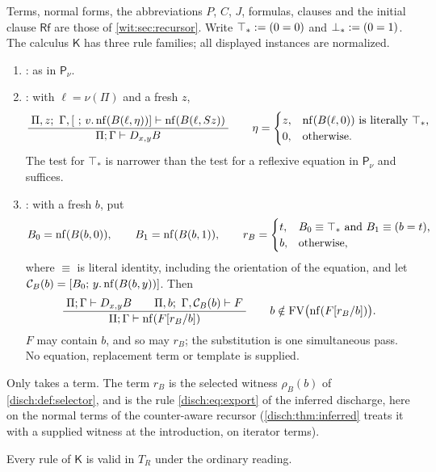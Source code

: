 Terms, normal forms, the abbreviations $P$, $C$, $J$, formulas, clauses and
the initial clause $\mathsf{Rf}$ are those of \cref{wit:sec:recursor}.
Write $\top_{*}\mathrel{:=}(0=0)$ and $\bot_{*}\mathrel{:=}(0=1)$.  The calculus
$\mathsf{K}$ has three rule families; all displayed instances are
normalized.
\begin{enumerate}[label=\textup{(\roman*)}]
\item {}: as in $\mathsf{P}_{\nu}$.
\item {}: with $\ell=\nu(\Pi)$ and a fresh $z$,
\[
 \infrule{\Pi,z;\ \Gamma,[\ ;\,v.\nf(B(\ell,\eta))]\proves
          \nf(B(\ell,\Suc z))}
         {\Pi;\Gamma\proves\D{x}{y}B}
 \qquad
 \eta=\begin{cases}
  z,&\text{$\nf(B(\ell,0))$ is literally $\top_{*}$,}\\
  0,&\text{otherwise.}
 \end{cases}
\]
 The test for $\top_{*}$ is narrower than the test for a reflexive equation
 in $\mathsf{P}_{\nu}$ and suffices.
\item {}: with a fresh $b$, put
\[
 B_0=\operatorname{nf}(B(b,0)),\qquad B_1=\operatorname{nf}(B(b,1)),\qquad
 r_B=\begin{cases}
  t,&\text{$B_0\equiv\top_{*}$ and $B_1\equiv(b=t)$,}\\
  b,&\text{otherwise,}
 \end{cases}
\]
 where $\equiv$ is literal identity, including the orientation of the
 equation, and let $\mathcal{C}_B(b)=[B_0;\,y.\operatorname{nf}(B(b,y))]$.  Then
\[
 \dfrac{\;\Pi;\Gamma\vdash D_{x,y}B\qquad
          \Pi,b;\ \Gamma,\mathcal{C}_B(b)\vdash F\;}{\;\Pi;\Gamma\vdash\operatorname{nf}(F[r_B/b])\;}
 \qquad b\notin\operatorname{FV}\bigl(\operatorname{nf}(F[r_B/b])\bigr).
\]
 $F$ may contain $b$, and so may $r_B$; the substitution is one simultaneous
 pass.  No equation, replacement term or template is supplied.
\end{enumerate}
Only  takes a term.  The term $r_B$ is the selected witness
$\rho_B(b)$ of \cref{disch:def:selector}, and  is the rule
\eqref{disch:eq:export} of the inferred discharge, here on the normal terms
of the counter-aware recursor (\cref{disch:thm:inferred} treats it with a
supplied witness at the introduction, on iterator terms).

\begin{lemma}[Soundness]
\label{wit:lem:k-sound}
Every rule of $\mathsf{K}$ is valid in $T_R$ under the ordinary reading.
\end{lemma}

